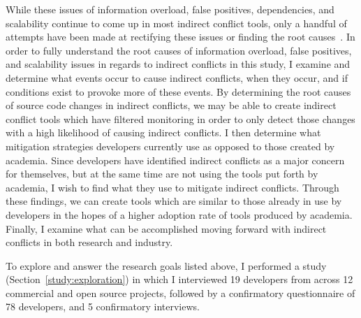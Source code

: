 While these issues of information overload, false positives, dependencies, and scalability continue to come up
in most indirect conflict tools, only a handful of attempts have been made at rectifying these issues or
finding the root causes~\cite{Holmes:2010:CAR,Kim:2011:ESA}. 
In order to fully understand the root causes of information overload, false positives, and
scalability issues in regards to indirect conflicts in this study, I examine and determine what events occur to
cause indirect conflicts, when they occur, and if conditions exist to provoke more of these events. By determining the root
causes of source code changes in indirect conflicts, we may be able to create indirect conflict tools which have filtered
monitoring in order to only detect those changes with a high likelihood of causing indirect conflicts.
I then determine what mitigation strategies developers currently use as opposed to those created
by academia. Since developers have identified indirect conflicts as a major concern for themselves, but at
the same time are not using the tools put forth by academia, I wish to find what they use to mitigate indirect
conflicts. Through these findings, we can create tools which are similar to those already in use by developers in
the hopes of a higher adoption rate of tools produced by academia.
Finally, I examine what can be accomplished moving forward with indirect conflicts
in both research and industry.

To explore and answer the research goals listed above, I performed a study (Section~\ref{study:exploration}) in which I 
interviewed 19 developers from across 12 commercial and open source projects, 
followed by a confirmatory questionnaire of 78 developers, and 5 confirmatory interviews.

